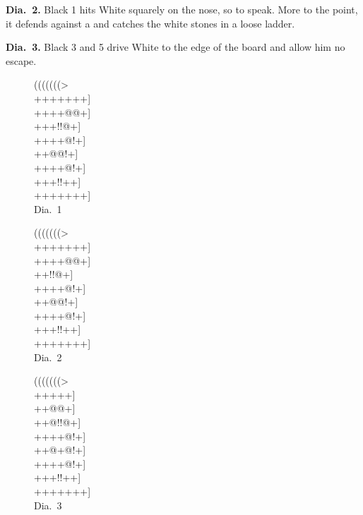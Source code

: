 \documentclass[mcrownvopaper,10pt,twopage,onecolumn,final]{memoir}
\begin{document}
\noindent
\textbf{Dia.\ 2.} Black 1 hits White squarely on the nose, so to speak. More to the
point, it defends against a and catches the white stones in a loose ladder.

\noindent
\textbf{Dia.\ 3.} Black 3 and 5 drive White to the edge of the board and allow
him no escape.

\begin{figure}[ht]
    \begin{minipage}[c]{0.33\linewidth}
        \centering    
        {\gnos%
        (((((((>\\
        +++++++]\\
        ++++@@+]\\
        +++!!@+]\\
        ++++@!+]\\
        ++@@!+]\\
        ++++@!+]\\
        +++!!++]\\
        +++++++]\\
        }
        Dia.\ 1
    \end{minipage}%
    \begin{minipage}[c]{0.33\linewidth}
        \centering    
        {\gnos%
        (((((((>\\
        +++++++]\\
        ++++@@+]\\
        ++{\gnosb{}}!!@+]\\
        ++++@!+]\\
        ++@@!+]\\
        ++++@!+]\\
        +++!!++]\\
        +++++++]\\
        }
        Dia.\ 2
    \end{minipage}%
    \begin{minipage}[c]{0.33\linewidth}
        \centering    
        {\gnos%
        (((((((>\\
        ++{\gnosb{}}{\gnosw{}}+++]\\
        ++{\gnosb{}}{\gnosw{}}@@+]\\
        ++@!!@+]\\
        ++++@!+]\\
        ++@+@!+]\\
        ++++@!+]\\
        +++!!++]\\
        +++++++]\\
        }
        Dia.\ 3
    \end{minipage}%
\end{figure}
\end{document}
